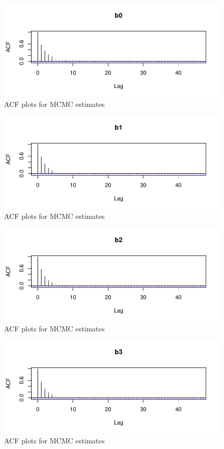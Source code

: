\documentclass[12pt]{article}
\begin{document}
\begin{figure}[H]

{\centering \includegraphics[width=0.5\linewidth]{bookdown_report_files/figure-latex/acf-1} 

}

\caption{ACF plots for MCMC estimates}\label{fig:acf-1}
\end{figure}
\begin{figure}[H]

{\centering \includegraphics[width=0.5\linewidth]{bookdown_report_files/figure-latex/acf-2} 

}

\caption{ACF plots for MCMC estimates}\label{fig:acf-2}
\end{figure}
\begin{figure}[H]

{\centering \includegraphics[width=0.5\linewidth]{bookdown_report_files/figure-latex/acf-3} 

}

\caption{ACF plots for MCMC estimates}\label{fig:acf-3}
\end{figure}
\begin{figure}[H]

{\centering \includegraphics[width=0.5\linewidth]{bookdown_report_files/figure-latex/acf-4} 

}

\caption{ACF plots for MCMC estimates}\label{fig:acf-4}
\end{figure}
\end{document}
